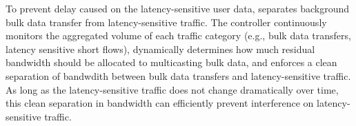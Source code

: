 To prevent delay caused on the latency-sensitive user data, 
\name separates background bulk data transfer from 
latency-sensitive traffic.
The \name controller continuously monitors the aggregated 
volume of each traffic category (e.g., bulk data transfers, 
latency sensitive short flows), dynamically
determines how much residual bandwidth should be allocated to
multicasting bulk data, and enforces a clean separation of 
bandwdith between bulk data transfers and latency-sensitive 
traffic.
As long as the latency-sensitive traffic does not change 
dramatically over time, 
this clean separation in bandwidth can efficiently prevent
interference on latency-sensitive traffic.



\begin{table}[t]
\centering
{}
\caption{\name's design choices and their benefit-cost tradeoffs}
\label{tab:design-choices}
\end{table}

